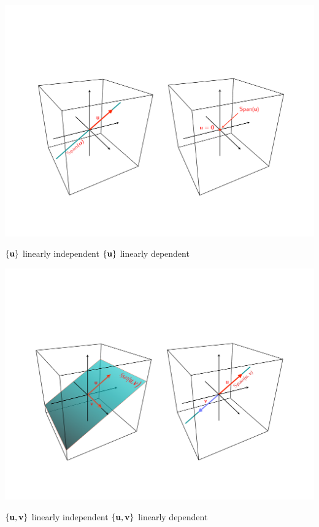 {\begin{center}
\includegraphics[width=160mm]{indep-vs-span1.pdf}
\end{center}

\hskip 15mm $\{{\bf u}\}$ linearly independent  \hskip 30mm $\{{\bf u}\}$ linearly dependent 



\vskip 10mm

\begin{center}
\includegraphics[width=160mm]{indep-vs-span2.pdf}
\end{center}

\hskip 15mm $\{{\bf u}, {\bf v} \}$ linearly independent  \hskip 25mm $\{{\bf u}, {\bf v}\}$ linearly dependent 

}
